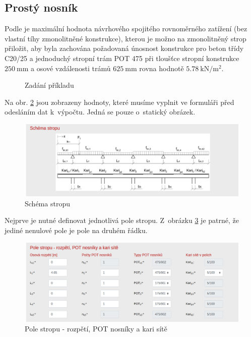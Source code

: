 \subsection{Prostý nosník}
Podle \cite[261]{PPN17} je maximální hodnota návrhového spojitého rovnoměrného zatížení (bez vlastní tíhy zmonolitněné konstrukce), kterou je možno na zmonolitněný strop přiložit, aby byla zachována požadovaná únosnost konstrukce pro beton třídy C20/25 a jednoduchý stropní trám POT 475 při tloušťce stropní konstrukce $\SI{250}{\milli\metre}$ a osové vzdálenosti trámů $\SI{625}{\milli\metre}$ rovna hodnotě $\SI{5,78}{\kilo\newton\per\metre\squared}$.
\begin{figure}[H]
    \caption{Zadání příkladu}
    \label{fig:wb_app_strop_simple_beam}
\end{figure}

Na obr. \ref{fig:wb_app_schema} jsou zobrazeny hodnoty, které musíme vyplnit ve formuláři před odesláním dat k~výpočtu. Jedná se pouze o~statický obrázek.
\begin{figure}[H]
    \includegraphics{assets/figures/wbapp/strop/00_schema.png}
    \caption{Schéma stropu}
    \label{fig:wb_app_schema}
\end{figure}

Nejprve je nutné definovat jednotlivá pole stropu. Z~obrázku \ref{fig:wb_app_pole_stropu} je patrné, že jediné nenulové pole je pole na druhém řádku.
\begin{figure}[H]
    \includegraphics{assets/figures/wbapp/strop/01_pole.png}
    \caption{Pole stropu - rozpětí, POT nosníky a kari sítě}
    \label{fig:wb_app_pole_stropu}
\end{figure}

